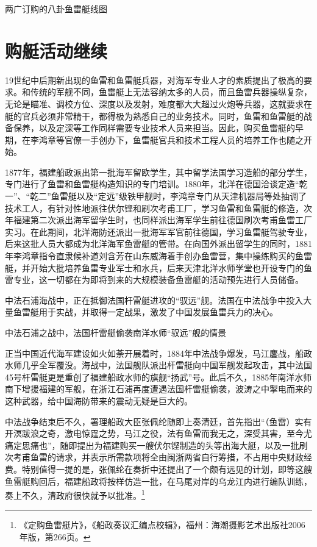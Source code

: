 \documentclass[12pt,UTF8]{ctexbook}
\begin{document}
两广订购的八卦鱼雷艇线图

\section{购艇活动继续}

19世纪中后期新出现的鱼雷和鱼雷艇兵器，对海军专业人才的素质提出了极高的要求。和传统的军舰不同，鱼雷艇上无法容纳太多的人员，而且鱼雷兵器操纵复杂，无论是瞄准、调校方位、深度以及发射，难度都大大超过火炮等兵器，这就要求在艇的官兵必须非常精干，都得极为熟悉自己的业务技术。同时，鱼雷和鱼雷艇的战备保养，以及定深等工作同样需要专业技术人员来担当。因此，购买鱼雷艇的早期，在李鸿章等官僚一手创办下，鱼雷艇官兵和技术工程人员的培养工作也随之开始。

1877年，福建船政派出第一批海军留欧学生，其中留学法国学习造船的部分学生，专门进行了鱼雷和鱼雷艇构造知识的专门培训。1880年，北洋在德国洽谈定造“乾一”、“乾二”鱼雷艇以及“定远”级铁甲舰时，李鸿章专门从天津机器局等处抽调了技术工人，有针对性地派往伏尔铿和刷次考甫工厂，学习鱼雷和鱼雷艇的修造，次年福建第二次派出海军留学生时，也同样派出海军学生前往德国刷次考甫鱼雷工厂实习。在此期间，北洋海防还派出一批海军军官前往德国，学习鱼雷艇驾驶专业，后来这批人员大都成为北洋海军鱼雷艇的管带。在向国外派出留学生的同时，1881年李鸿章指令直隶候补道刘含芳在山东威海着手创办鱼雷营，集中操练购买的鱼雷艇，并开始大批培养鱼雷专业军士和水兵，后来天津北洋水师学堂也开设专门的鱼雷专业，这一切都在为即将到来的大规模装备鱼雷艇的活动预先进行人员储备。

中法石浦海战中，正在抵御法国杆雷艇进攻的“驭远”舰。法国在中法战争中投入大量鱼雷艇用于实战，并取得一定战果，激发了中国发展鱼雷兵力的决心。

中法石浦之战中，法国杆雷艇偷袭南洋水师“驭远”舰的情景

正当中国近代海军建设如火如荼开展着时，1884年中法战争爆发，马江鏖战，船政水师几乎全军覆没。海战中，法国舰队派出杆雷艇向中国军舰发起攻击，其中法国45号杆雷艇更是重创了福建船政水师的旗舰“扬武”号。此后不久，1885年南洋水师南下增援福建的军舰，在浙江石浦再度遭遇法国杆雷艇偷袭，波涛之中掣电而来的这种武器，给中国海防带来的震动无疑是巨大的。

中法战争结束后不久，署理船政大臣张佩纶随即上奏清廷，首先指出“（鱼雷）实有开溟跋浪之奇，激电惊霆之势，马江之役，法有鱼雷而我无之，深受其害，至今尤痛定思痛也”，随即提出为福建购买一艘伏尔铿制造的头等出海大艇，以及一批刷次考甫鱼雷的请求，并表示所需款项将全由闽浙两省自行筹措，不占用中央财政经费。特别值得一提的是，张佩纶在奏折中还提出了一个颇有远见的计划，即等这艘鱼雷艇购回后，福建船政将按样仿造一批，在马尾对岸的乌龙江内进行编队训练，奏上不久，清政府很快就予以批准。\footnote{《定购鱼雷艇片》，《船政奏议汇编点校辑》，福州：海潮摄影艺术出版社2006年版，第266页。}
\end{document}
